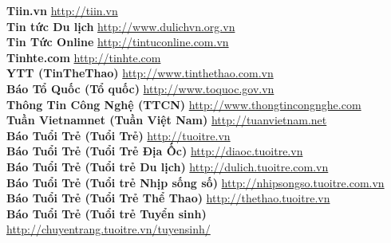 \textbf{Tiin.vn}  \hspace{0.5in} \href{http://tiin.vn}{http://tiin.vn} \\ 
\textbf{Tin tức Du lịch}  \hspace{0.5in} \href{http://www.dulichvn.org.vn}{http://www.dulichvn.org.vn} \\ 
\textbf{Tin Tức Online}  \hspace{0.5in} \href{http://tintuconline.com.vn}{http://tintuconline.com.vn} \\ 
\textbf{Tinhte.com}  \hspace{0.5in} \href{http://tinhte.com}{http://tinhte.com} \\ 
\textbf{YTT (TinTheThao)}  \hspace{0.5in} \href{http://www.tinthethao.com.vn}{http://www.tinthethao.com.vn} \\ 
\textbf{Báo Tổ Quốc (Tổ quốc)}  \hspace{0.5in} \href{http://www.toquoc.gov.vn}{http://www.toquoc.gov.vn} \\ 
\textbf{Thông Tin Công Nghệ (TTCN)}  \hspace{0.5in} \href{http://www.thongtincongnghe.com}{http://www.thongtincongnghe.com} \\ 
\textbf{Tuần Vietnamnet (Tuần Việt Nam)}  \hspace{0.5in} \href{http://tuanvietnam.net}{http://tuanvietnam.net} \\ 
\textbf{Báo Tuổi Trẻ (Tuổi Trẻ)}  \hspace{0.5in} \href{http://tuoitre.vn}{http://tuoitre.vn} \\ 
\textbf{Báo Tuổi Trẻ (Tuổi Trẻ Địa Ốc)} \hspace{0.5in} \href{http://diaoc.tuoitre.vn}{http://diaoc.tuoitre.vn} \\ 
\textbf{Báo Tuổi Trẻ (Tuổi trẻ Du lịch)} \hspace{0.5in} \href{http://dulich.tuoitre.com.vn}{http://dulich.tuoitre.com.vn} \\ 
\textbf{Báo Tuổi Trẻ (Tuổi trẻ Nhịp sống số)} \hspace{0.5in} \href{http://nhipsongso.tuoitre.com.vn}{http://nhipsongso.tuoitre.com.vn} \\ 
\textbf{Báo Tuổi Trẻ (Tuổi Trẻ Thể Thao)} \hspace{0.5in} \href{http://thethao.tuoitre.vn}{http://thethao.tuoitre.vn} \\ 
\textbf{Báo Tuổi Trẻ (Tuổi trẻ Tuyển sinh)} \hspace{0.5in} \href{http://chuyentrang.tuoitre.vn/tuyensinh/}{http://chuyentrang.tuoitre.vn/tuyensinh/} \\ 
